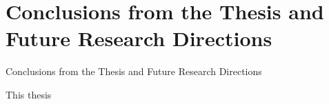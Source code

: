 \chapter[Conclusions from the Thesis and Future Research Directions]{Conclusions from the Thesis and Future Research Directions}{Conclusions from the Thesis and Future Research Directions}
\label{chap:conclusion}


{\Huge \calligra T}his thesis 